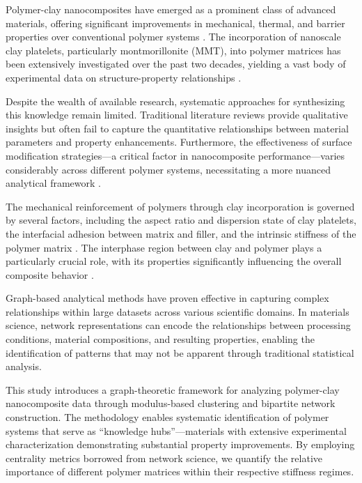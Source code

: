 \documentclass[conference]{IEEEtran}
\begin{document}
Polymer-clay nanocomposites have emerged as a prominent class of advanced materials, offering significant improvements in mechanical, thermal, and barrier properties over conventional polymer systems \cite{ray2003polymer, azeez2013epoxy}. The incorporation of nanoscale clay platelets, particularly montmorillonite (MMT), into polymer matrices has been extensively investigated over the past two decades, yielding a vast body of experimental data on structure-property relationships \cite{okada2006twenty, ray2014recent}.

Despite the wealth of available research, systematic approaches for synthesizing this knowledge remain limited. Traditional literature reviews provide qualitative insights but often fail to capture the quantitative relationships between material parameters and property enhancements. Furthermore, the effectiveness of surface modification strategies---a critical factor in nanocomposite performance---varies considerably across different polymer systems, necessitating a more nuanced analytical framework \cite{chee2019effect, manias2001polypropylene}.

The mechanical reinforcement of polymers through clay incorporation is governed by several factors, including the aspect ratio and dispersion state of clay platelets, the interfacial adhesion between matrix and filler, and the intrinsic stiffness of the polymer matrix \cite{zare2017approach, zairi2011study}. The interphase region between clay and polymer plays a particularly crucial role, with its properties significantly influencing the overall composite behavior \cite{heydari2016multiscale, zare2020development}.

Graph-based analytical methods have proven effective in capturing complex relationships within large datasets across various scientific domains. In materials science, network representations can encode the relationships between processing conditions, material compositions, and resulting properties, enabling the identification of patterns that may not be apparent through traditional statistical analysis.

This study introduces a graph-theoretic framework for analyzing polymer-clay nanocomposite data through modulus-based clustering and bipartite network construction. The methodology enables systematic identification of polymer systems that serve as ``knowledge hubs''---materials with extensive experimental characterization demonstrating substantial property improvements. By employing centrality metrics borrowed from network science, we quantify the relative importance of different polymer matrices within their respective stiffness regimes.
\end{document}
